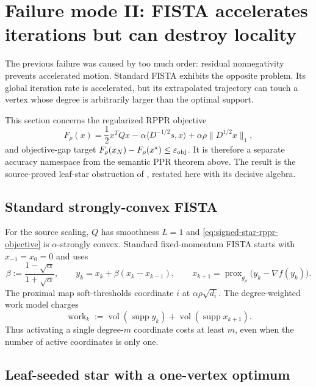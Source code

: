 \section{Failure mode II: FISTA accelerates iterations but can destroy locality}
\label{sec:signed-star-fista-failure}

The previous failure was caused by too much order: residual nonnegativity
prevents accelerated motion.  Standard FISTA exhibits the opposite problem.
Its global iteration rate is accelerated, but its extrapolated trajectory can
touch a vertex whose degree is arbitrarily larger than the optimal support.

This section concerns the regularized RPPR objective
\begin{equation}
  F_\rho(x)
  =\frac12x^TQx-\alpha\langle D^{-1/2}s,x\rangle
   +\alpha\rho\|D^{1/2}x\|_1,
  \label{eq:signed-star-rppr-objective}
\end{equation}
and objective-gap target
$F_\rho(x_N)-F_\rho(x^\star)\le\varepsilon_{\rm obj}$.  It is therefore a
separate accuracy namespace from the semantic PPR theorem above.  The result
is the source-proved leaf-star obstruction of
\citet{fountoulakis2026complexity}, restated here with its decisive algebra.

\subsection{Standard strongly-convex FISTA}

For the source scaling, $Q$ has smoothness $L=1$ and
\eqref{eq:signed-star-rppr-objective} is $\alpha$-strongly convex.  Standard
fixed-momentum FISTA starts with $x_{-1}=x_0=0$ and uses
\begin{equation}
  \beta:=\frac{1-\sqrt\alpha}{1+\sqrt\alpha},
  \qquad
  y_k=x_k+\beta(x_k-x_{k-1}),
  \qquad
  x_{k+1}=\operatorname{prox}_{g_\rho}
      \bigl(y_k-\nabla f(y_k)\bigr).
  \label{eq:signed-star-fista}
\end{equation}
The proximal map soft-thresholds coordinate $i$ at
$\alpha\rho\sqrt{d_i}$.  The degree-weighted work model charges
\begin{equation}
  \operatorname{work}_k
  :=\operatorname{vol}(\operatorname{supp}y_k)
   +\operatorname{vol}(\operatorname{supp}x_{k+1}).
  \label{eq:signed-star-fista-work}
\end{equation}
Thus activating a single degree-$m$ coordinate costs at least $m$, even when
the number of active coordinates is only one.

\subsection{Leaf-seeded star with a one-vertex optimum}

